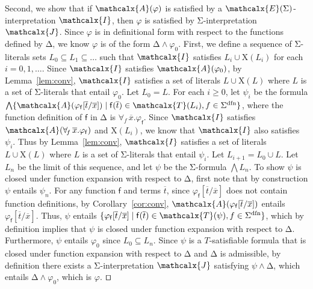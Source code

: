 \documentclass[runningheads,a4paper]{llncs}
\newcommand\DDD{\Delta}
\newcommand{\con}[1]{\mathsf{#1}}
\renewcommand\vec[1]{\overline{#1}}
\let\oldcup=\cup
\def\cup{\mathrel{\oldcup}}
\let\oldSigma=\Sigma
\def\Sigma{\mathrm{\oldSigma}}
\let\oldDelta=\Delta
\def\Delta{\mathrm{\oldDelta}}
\let\oldwedge=\wedge
\def\wedge{\mathrel{\oldwedge}}
\newcommand{\terms}{\mathcalx{T}}
\newcommand{\I}{\mathcalx{I}}
\newcommand{\J}{\mathcalx{J}}
\newcommand{\conv}{\mathcalx{A}}
\newcommand{\sfundefs}[1]{#1^\mathrm{dfn}}
\newcommand{\forallf}[1]{\forall_{\!#1\:}}
\newcommand{\extendsig}[1]{\mathcalx{E}( #1 )}
\newcommand{\rem}[1]{\textcolor{red}{[#1]}}
\newcommand{\ajr}[1]{\rem{#1 --ajr}}
\newcommand{\absconstraints}{\mathrm{X}}
\renewcommand\qed{{\hfill$\squareforqed$}}
\begin{document}
\begin{proofsketch}
Second, we show that if $\conv( \varphi )$ is satisfied by a
$\extendsig{\Sigma}$-interpretation $\I$, then $\varphi$ is satisfied by
$\Sigma$-interpretation $\J$. Since $\varphi$ is in definitional form with
respect to the functions defined by $\DDD$, we know $\varphi$ is of the form
$\DDD \wedge \varphi_0$. 
First, we define a sequence of $\Sigma$-literals sets $L_0 \subseteq L_1 \subseteq \ldots$
such that $\I$ satisfies $L_i \cup \absconstraints( L_i )$ for each $i = 0, 1, \ldots$.
Since $\I$ satisfies $\conv( \varphi_0 )$,
by Lemma~\ref{lem:conv}, 
$\I$ satisfies a set of literals $L \cup \absconstraints( L )$ where $L$ is a set of $\Sigma$-literals that entail $\varphi_0$.
Let $L_0 = L$.
For each $i \geq 0$,
let $\psi_i$ be the formula $\bigwedge \{ \conv( \varphi_{\con{f}}[ \vec t / \vec x ] ) \mid \con{f}( \vec t ) \in \terms( L_i ), f \in \sfundefs{\Sigma} \}$,
where the function definition of $\con{f}$ in $\DDD$ is $\forallf{f} \vec x. \varphi_{\con{f}}$.
Since $\I$ satisfies $\conv( \forallf{f} \vec x. \varphi_{\con{f}} )$ and $\absconstraints( L_i )$,
we know that $\I$ also satisfies $\psi_i$.
Thus by Lemma~\ref{lem:conv},
$\I$ satisfies a set of literals $L \cup \absconstraints( L )$ where $L$ is a set of $\Sigma$-literals that entail $\psi_i$.
Let $L_{i+1} = L_0 \cup L$.
Let $L_n$ be the limit of this sequence,
and let $\psi$ be the $\Sigma$-formula $\bigwedge L_n$.
To show $\psi$ is closed under function expansion with respect to $\DDD$,
first note that by construction $\psi$ entails $\psi_n$.
For any function $\con{f}$ and terms $\vec t$, since $\varphi_{\con{f}}[ \vec t / \vec x ]$ does not contain function definitions,
by Corollary~\ref{cor:conv},
$\conv( \varphi_{\con{f}}[ \vec t / \vec x ] )$ entails $\varphi_{\con{f}}[ \vec t / \vec x ]$.
Thus, $\psi$ entails $\{ \varphi_{\con{f}}[ \vec t / \vec x ] \mid \con{f}( \vec t ) \in \terms( \psi ), f \in \sfundefs{\Sigma} \}$,
which by definition implies that $\psi$ is closed under function expansion with respect to $\DDD$.
Furthermore, $\psi$ entails $\varphi_0$ since $L_0 \subseteq L_n$.
Since $\psi$ is a $T$-satisfiable formula that is closed under function expansion with respect to $\DDD$ and $\DDD$ is admissible, 
by definition there exists a $\Sigma$-interpretation $\J$ satisfying $\psi \wedge \DDD$, which entails $\DDD \wedge \varphi_0$,
which is $\varphi$.
\qed
\end{proofsketch}
\end{document}
